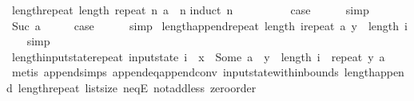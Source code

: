 \begin{isabellebody}
\isanewline
{}\isamarkupfalse%
\ length{\isacharunderscore}repeat{\isacharcolon}\ {\isachardoublequoteopen}length\ {\isacharparenleft}repeat\ n\ a{\isacharparenright}\ {\isacharequal}\ n{\isachardoublequoteclose}\isanewline
%
\isadelimproof
%
\endisadelimproof
%
\isatagproof
{}\isamarkupfalse%
{\isacharparenleft}induct\ n{\isacharparenright}\isanewline
\ \ \isamarkupfalse%
\ {}\isanewline
\ \ \isamarkupfalse%
\ \isamarkupfalse%
\ {\isacharquery}case\isanewline
\ \ \ \ \isamarkupfalse%
\ simp\isanewline
{}\isamarkupfalse%
\isanewline
\ \ \isamarkupfalse%
\ {\isacharparenleft}Suc\ a{\isacharparenright}\isanewline
\ \ \isamarkupfalse%
\ \isamarkupfalse%
\ {\isacharquery}case\isanewline
\ \ \ \ \isamarkupfalse%
\ simp\isanewline
{}\isamarkupfalse%
%
\endisatagproof
{\isafoldproof}%
%
\isadelimproof
\isanewline
%
\endisadelimproof
\isanewline
{}\isamarkupfalse%
\ length{\isacharunderscore}append{\isacharunderscore}repeat{\isacharcolon}\ {\isachardoublequoteopen}length\ {\isacharparenleft}i{\isacharat}{\isacharparenleft}repeat\ a\ y{\isacharparenright}{\isacharparenright}\ {\isasymge}\ length\ i{\isachardoublequoteclose}\isanewline
%
\isadelimproof
\ \ %
\endisadelimproof
%
\isatagproof
{}\isamarkupfalse%
\ simp%
\endisatagproof
{\isafoldproof}%
%
\isadelimproof
\isanewline
%
\endisadelimproof
\isanewline
{}\isamarkupfalse%
\ length{\isacharunderscore}input{}state{\isacharunderscore}repeat{\isacharcolon}\ {\isachardoublequoteopen}input{}state\ i\ {\isachardollar}\ x\ {\isacharequal}\ Some\ a\ {\isasymLongrightarrow}\ y\ {\isacharless}\ length\ {\isacharparenleft}i\ {\isacharat}\ repeat\ y\ a{\isacharparenright}{\isachardoublequoteclose}\isanewline
%
\isadelimproof
\ \ %
\endisadelimproof
%
\isatagproof
{}\isamarkupfalse%
\ {\isacharparenleft}metis\ append{\isachardot}simps{\isacharparenleft}{}{\isacharparenright}\ append{\isacharunderscore}eq{\isacharunderscore}append{\isacharunderscore}conv\ input{}state{\isacharunderscore}within{\isacharunderscore}bounds\ length{\isacharunderscore}append\ length{\isacharunderscore}repeat\ list{\isachardot}size{\isacharparenleft}{}{\isacharparenright}\ neqE\ not{\isacharunderscore}add{\isacharunderscore}less{}\ zero{\isacharunderscore}order{\isacharparenleft}{}{\isacharparenright}{\isacharparenright}%

\end{isabellebody}

